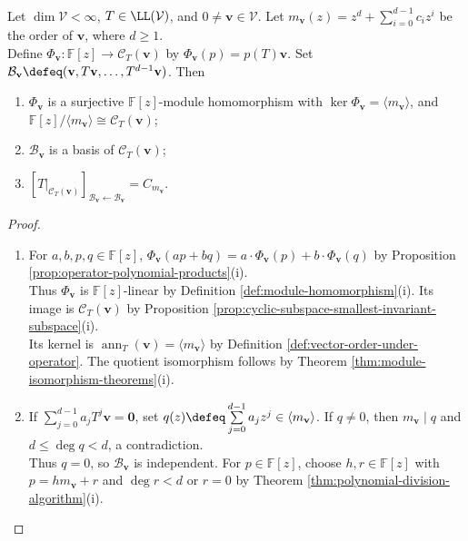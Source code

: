 \begin{theorem} \label{thm:cyclic-subspace-quotient-and-companion} \\
Let $\dim\mathcal{V}<\infty$, $T\in\LL(\mathcal{V})$, and $0\neq\mathbf{v}\in\mathcal{V}$. Let $m_{\mathbf{v}}(z)=z^d+\sum\limits_{i=0}^{d-1}c_iz^i$ be the order of $\mathbf{v}$, where $d\geq1$.\\
Define $\Phi_{\mathbf{v}}:\mathbb{F}[z]\to\mathcal{C}_T(\mathbf{v})$ by $\Phi_{\mathbf{v}}(p)=p(T)\mathbf{v}$. Set $\mathcal{B}_{\mathbf{v}}\defeq(\mathbf{v},T\mathbf{v},\ldots,T^{d-1}\mathbf{v})$. Then
\begin{enumerate}[label=(\roman*)]
\setlength{\itemsep}{0pt}
\item $\Phi_{\mathbf{v}}$ is a surjective $\mathbb{F}[z]$-module homomorphism with $\ker\Phi_{\mathbf{v}}=\langle m_{\mathbf{v}}\rangle$, and $\mathbb{F}[z]/\langle m_{\mathbf{v}}\rangle\cong\mathcal{C}_T(\mathbf{v})$;
\item $\mathcal{B}_{\mathbf{v}}$ is a basis of $\mathcal{C}_T(\mathbf{v})$;
\item $[T|_{\mathcal{C}_T(\mathbf{v})}]_{\mathcal{B}_{\mathbf{v}}\leftarrow\mathcal{B}_{\mathbf{v}}}=C_{m_{\mathbf{v}}}$.
\end{enumerate}
\begin{proof}
\begin{enumerate}[label=(\roman*)]
\setlength{\itemsep}{0pt}
\item For $a,b,p,q\in\mathbb{F}[z]$, $\Phi_{\mathbf{v}}(ap+bq)=a\cdot\Phi_{\mathbf{v}}(p)+b\cdot\Phi_{\mathbf{v}}(q)$ by Proposition \ref{prop:operator-polynomial-products}(i).\\
Thus $\Phi_{\mathbf{v}}$ is $\mathbb{F}[z]$-linear by Definition \ref{def:module-homomorphism}(i). Its image is $\mathcal{C}_T(\mathbf{v})$ by Proposition \ref{prop:cyclic-subspace-smallest-invariant-subspace}(i).\\
Its kernel is $\operatorname{ann}_T(\mathbf{v})=\langle m_{\mathbf{v}}\rangle$ by Definition \ref{def:vector-order-under-operator}. The quotient isomorphism follows by Theorem \ref{thm:module-isomorphism-theorems}(i).
\item If $\sum\limits_{j=0}^{d-1}a_jT^j\mathbf{v}=\mathbf{0}$, set $q(z)\defeq\sum\limits_{j=0}^{d-1}a_jz^j\in\langle m_{\mathbf{v}}\rangle$. If $q\neq0$, then $m_{\mathbf{v}}\mid q$ and $d\leq\deg q<d$, a contradiction.\\
Thus $q=0$, so $\mathcal{B}_{\mathbf{v}}$ is independent. For $p\in\mathbb{F}[z]$, choose $h,r\in\mathbb{F}[z]$ with $p=hm_{\mathbf{v}}+r$ and $\deg r<d$ or $r=0$ by Theorem \ref{thm:polynomial-division-algorithm}(i).\\

\end{enumerate}
\end{proof}
\end{theorem}
